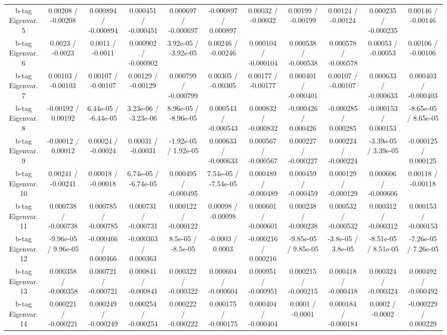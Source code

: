 \begin{table}[htbp]
\begin{center}
\begin{tabular}{|c|c|c|c|c|c|c|c|c|c|c|}
  b-tag Eigenvar. 5 & 0.00208 / -0.00208 & 0.000894 / -0.000894 & 0.000451 / -0.000451 & 0.000697 / -0.000697 & -0.000897 / 0.000897 & 0.00032 / -0.00032 & 0.00199 / -0.00199 & 0.00124 / -0.00124 & 0.000235 / -0.000235 & 0.00146 / -0.00146 \\ 
  b-tag Eigenvar. 6 & 0.0023 / -0.0023 & 0.0011 / -0.0011 & 0.000902 / -0.000902 & 3.92e-05 / -3.92e-05 & 0.00246 / -0.00246 & 0.000104 / -0.000104 & 0.000538 / -0.000538 & 0.000578 / -0.000578 & 0.00053 / -0.00053 & 0.00106 / -0.00106 \\ 
  b-tag Eigenvar. 7 & 0.00103 / -0.00103 & 0.00107 / -0.00107 & 0.00129 / -0.00129 & 0.000799 / -0.000799 & 0.00305 / -0.00305 & 0.00177 / -0.00177 & 0.000401 / -0.000401 & 0.00107 / -0.00107 & 0.000633 / -0.000633 & 0.000403 / -0.000403 \\ 
  b-tag Eigenvar. 8 & -0.00192 / 0.00192 & 6.44e-05 / -6.44e-05 & 3.23e-06 / -3.23e-06 & 8.96e-05 / -8.96e-05 & 0.000543 / -0.000543 & 0.000832 / -0.000832 & -0.000426 / 0.000426 & -0.000285 / 0.000285 & -0.000153 / 0.000153 & -8.65e-05 / 8.65e-05 \\ 
  b-tag Eigenvar. 9 & -0.00012 / 0.00012 & 0.00024 / -0.00024 & 0.00031 / -0.00031 & -1.92e-05 / 1.92e-05 & 0.000633 / -0.000633 & 0.000567 / -0.000567 & 0.000227 / -0.000227 & 0.000224 / -0.000224 & -3.39e-05 / 3.39e-05 & -0.000125 / 0.000125 \\ 
  b-tag Eigenvar. 10 & 0.00241 / -0.00241 & 0.00018 / -0.00018 & 6.74e-05 / -6.74e-05 & 0.000495 / -0.000495 & 7.54e-05 / -7.54e-05 & 0.000489 / -0.000489 & 0.000459 / -0.000459 & 0.000129 / -0.000129 & 0.000606 / -0.000606 & 0.00118 / -0.00118 \\ 
  b-tag Eigenvar. 11 & 0.000738 / -0.000738 & 0.000785 / -0.000785 & 0.000731 / -0.000731 & 0.000122 / -0.000122 & 0.00098 / -0.00098 & 0.000601 / -0.000601 & 0.000238 / -0.000238 & 0.000532 / -0.000532 & 0.000312 / -0.000312 & 0.000153 / -0.000153 \\ 
  b-tag Eigenvar. 12 & -9.96e-05 / 9.96e-05 & -0.000466 / 0.000466 & -0.000363 / 0.000363 & 8.5e-05 / -8.5e-05 & -0.0003 / 0.0003 & -0.000216 / 0.000216 & -9.85e-05 / 9.85e-05 & -3.8e-05 / 3.8e-05 & -8.51e-05 / 8.51e-05 & -7.26e-05 / 7.26e-05 \\ 
  b-tag Eigenvar. 13 & 0.000358 / -0.000358 & 0.000721 / -0.000721 & 0.000841 / -0.000841 & 0.000322 / -0.000322 & 0.000604 / -0.000604 & 0.000951 / -0.000951 & 0.000215 / -0.000215 & 0.000418 / -0.000418 & 0.000324 / -0.000324 & 0.000492 / -0.000492 \\ 
  b-tag Eigenvar. 14 & 0.000221 / -0.000221 & 0.000249 / -0.000249 & 0.000254 / -0.000254 & 0.000222 / -0.000222 & 0.000175 / -0.000175 & 0.000404 / -0.000404 & 0.0001 / -0.0001 & 0.000184 / -0.000184 & 0.0002 / -0.0002 & -0.000229 / 0.000229 \\ 

\end{tabular}
\end{center}
\end{table}
